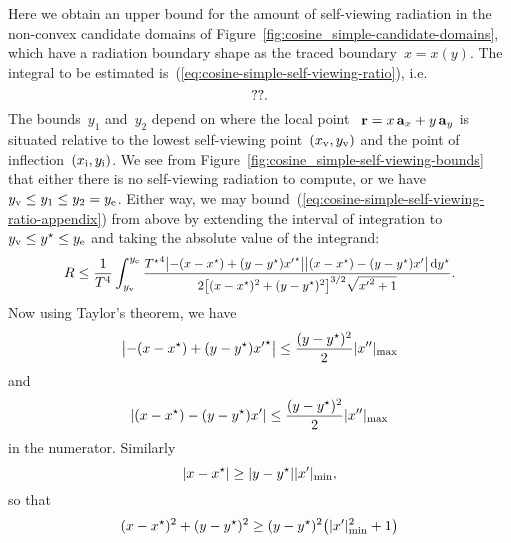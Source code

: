Here we obtain an upper bound for the amount of self-viewing radiation
in the non-convex candidate domains
of Figure~\ref{fig:cosine_simple-candidate-domains},
which have a radiation boundary shape as the traced boundary~$x = x (y)$.
The integral to be estimated is~(\ref{eq:cosine-simple-self-viewing-ratio}),
i.e.
\begin{equation}
  \usecontent{eq:cosine-simple-self-viewing-ratio}.
  \label{eq:cosine-simple-self-viewing-ratio-appendix}
\end{equation}
The bounds~$y_1$ and~$y_2$ depend
on where the local point~%
$\boldsymbol{\mathbf{r}} = x \mathop{}\!\boldsymbol{\mathbf{a}}_{x} + y \mathop{}\!\boldsymbol{\mathbf{a}}_{y}$ is situated
relative to the lowest self-viewing point~$(x_{\mathrm{v}}, y_{\mathrm{v}})$
and the point of inflection~$(x_{\mathrm{i}}, y_{\mathrm{i}})$.
We see from Figure~\ref{fig:cosine_simple-self-viewing-bounds}
that either there is no self-viewing radiation to compute,
or we have~$y_{\mathrm{v}} \le y_1 \le y_2 = y_{\mathrm{e}}$.
Either way,
we may bound~(\ref{eq:cosine-simple-self-viewing-ratio-appendix}) from above
by extending the interval of integration to~$y_{\mathrm{v}} \le y^\star \le y_{\mathrm{e}}$
and taking the absolute value of the integrand:
\begin{equation}
  R \le
    \frac{1}{T^4}
    \int_{y_\view}^{y_\End}
      \smallerfrac{
        {T^\star}^4
        \abs[\big]{-(x - x^\star) + (y - y^\star) {x'}^\star}
        \abs[\big]{(x - x^\star) - (y - y^\star) x'}
        \td y^\star
      }{
        2
        \squarebr[\big]{(x - x^\star)^2 + (y - y^\star)^2}^{3/2}
        \sqrt{{x'}^2 + 1}
      }.
  \label{eq:cosine-simple-self-viewing-ratio-bound-bounds}
\end{equation}
Now using Taylor's theorem, we have
\begin{equation}
  \abs*{-(x - x^\star) + (y - y^\star) {x'}^\star} \le
    \frac{(y - y^\star)^2}{2} \abs{x''}_{\max}
  \label{eq:taylor-second-order-remainder-upper-bound-starred}
\end{equation}
and
\begin{equation}
  \abs*{(x - x^\star) - (y - y^\star) x'} \le
    \frac{(y - y^\star)^2}{2} \abs{x''}_{\max}
  \label{eq:taylor-second-order-remainder-upper-bound}
\end{equation}
in the numerator.
Similarly
\begin{equation}
  \abs{x - x^\star} \ge \abs{y - y^\star} \abs{x'}_{\min},
  \label{eq:taylor-first-order-remainder-lower-bound}
\end{equation}
so that
\begin{equation}
  (x - x^\star)^2 + (y - y^\star)^2 \ge
    (y - y^\star)^2 \roundbr*{\abs{x'}_{\min}^2 + 1}
  \label{eq:displacement-squared-lower-bound}
\end{equation}
